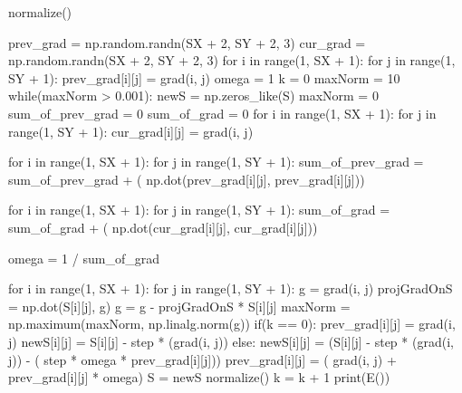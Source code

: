 \documentclass[ 12pt,x11names]{article}
\begin{document}
\begin{python}
normalize()

prev_grad =  np.random.randn(SX + 2, SY + 2, 3)
cur_grad = np.random.randn(SX + 2, SY + 2, 3)
for i in range(1, SX + 1):
    for j in range(1, SY + 1):
        prev_grad[i][j] = grad(i, j)
omega = 1
k = 0
maxNorm = 10
while(maxNorm > 0.001):
    newS = np.zeros_like(S)
    maxNorm = 0
    sum_of_prev_grad = 0
    sum_of_grad  =  0
    for i in range(1, SX + 1):
        for j in range(1, SY + 1):
            cur_grad[i][j] = grad(i,  j)

    for i in range(1, SX + 1):
        for j in range(1, SY + 1):
            sum_of_prev_grad = sum_of_prev_grad + (
                np.dot(prev_grad[i][j], prev_grad[i][j]))

    for i in range(1, SX + 1):
        for j in range(1, SY + 1):
            sum_of_grad = sum_of_grad + (
                np.dot(cur_grad[i][j], cur_grad[i][j]))

    omega = 1 / sum_of_grad

    for i in range(1, SX + 1):
        for j in range(1, SY + 1):
            g = grad(i,  j)
            projGradOnS = np.dot(S[i][j], g)
            g = g - projGradOnS * S[i][j]
            maxNorm = np.maximum(maxNorm, np.linalg.norm(g))
            if(k == 0):
                prev_grad[i][j] = grad(i, j)
                newS[i][j] = S[i][j] - step * (grad(i, j))
            else:
                newS[i][j] = (S[i][j] - step * (grad(i, j)) -
                             ( step * omega *  prev_grad[i][j]))
                prev_grad[i][j] = (
                    grad(i, j) + prev_grad[i][j] * omega)
    S = newS
    normalize()
    k = k + 1
print(E())

 \end{python}

\newpage
\end{document}
